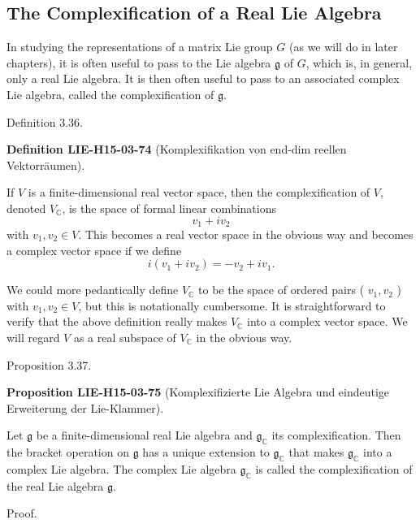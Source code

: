 \documentclass[10pt, letterpaper]{article}
\newcommand{\CustomHeading}[3]{%
  \par\medskip\noindent%
  \textbf{#1 #2} \textnormal{(#3)}.\enskip%
}
\newenvironment{DEF}[2]{\begin{unitbox}\CustomHeading{Definition}{#1}{#2}}{\end{unitbox}}
\newenvironment{PROP}[2]{\begin{unitbox}\CustomHeading{Proposition}{#1}{#2}}{\end{unitbox}}
\begin{document}
\subsection*{The Complexification of a Real Lie Algebra}
In studying the representations of a matrix Lie group $G$ (as we will do in later chapters), it is often useful to pass to the Lie algebra $\mathfrak{g}$ of $G$, which is, in general, only a real Lie algebra. It is then often useful to pass to an associated complex Lie algebra, called the complexification of $\mathfrak{g}$.



Definition 3.36. 


\begin{DEF}{LIE-H15-03-74}{Komplexifikation von end-dim reellen Vektorräumen}
If $V$ is a finite-dimensional real vector space, then the complexification of $V$, denoted $V_{\mathbb{C}}$, is the space of formal linear combinations
$$
v_{1}+i v_{2}
$$
with $v_{1}, v_{2} \in V$. This becomes a real vector space in the obvious way and becomes a complex vector space if we define
$$
i\left(v_{1}+i v_{2}\right)=-v_{2}+i v_{1} .
$$

We could more pedantically define $V_{\mathbb{C}}$ to be the space of ordered pairs ( $v_{1}, v_{2}$ ) with $v_{1}, v_{2} \in V$, but this is notationally cumbersome. It is straightforward to verify that the above definition really makes $V_{\mathbb{C}}$ into a complex vector space. We will regard $V$ as a real subspace of $V_{\mathbb{C}}$ in the obvious way.
\end{DEF}

Proposition 3.37. 


\begin{PROP}{LIE-H15-03-75}{Komplexifizierte Lie Algebra und eindeutige Erweiterung der Lie-Klammer}
Let $\mathfrak{g}$ be a finite-dimensional real Lie algebra and $\mathfrak{g}_{\mathbb{C}}$ its complexification. Then the bracket operation on $\mathfrak{g}$ has a unique extension to $\mathfrak{g}_{\mathbb{C}}$ that makes $\mathfrak{g}_{\mathbb{C}}$ into a complex Lie algebra. The complex Lie algebra $\mathfrak{g}_{\mathbb{C}}$ is called the complexification of the real Lie algebra $\mathfrak{g}$.
\end{PROP}

Proof. 
\end{document}
